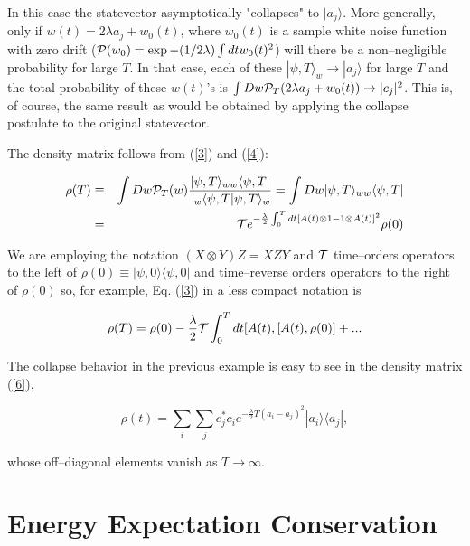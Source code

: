 \documentclass[12pt]{article}
\begin{document}
\noindent In this case the statevector asymptotically 
"collapses" to $|a_{j}\rangle$. More generally, only if 
$w(t)=2\lambda a_{j}+w_{0}(t)$, where $w_{0}(t)$ is a sample white noise function with 
zero drift (${\cal P}(w_{0})=\exp -(1/2\lambda)\int dtw_{0}(t)^{2}$) will there be a  
non--negligible probability for large $T$.  In that case, 
each of these $|\psi,T\rangle_{w}\rightarrow |a_{j}\rangle$ for large $T$ and the 
total probability of these $w(t)$'s is 
$\int Dw{\cal P}_{T}(2\lambda a_{j}+w_{0}(t))\rightarrow |c_{j}|^{2}$. 
This is, of course, the same result as would be obtained by applying 
the collapse postulate to the original statevector. 

	The density matrix follows from (\ref{3}) and (\ref{4}):  
	
\begin{eqnarray}\label{6}
	\rho (T)&\equiv&\int Dw{\cal P}_{T}(w)\frac{|\psi,T\rangle_{ww}
	\langle\psi,T|}{\ _{w}\langle\psi,T|\psi,T\rangle_{w}}
	=\int Dw|\psi,T\rangle_{ww}\langle\psi,T|\nonumber\\
	&=&{\cal T}e^
	{-\frac{\lambda}{2}\int_{0}^{T} dt[A(t)\otimes 1-1\otimes A(t)]^{2}}\rho (0)
\end{eqnarray} 

\noindent We are employing the notation $(X\otimes Y)Z=XZY$ 
and ${\cal T}$ time--orders operators to the left of $\rho (0)\equiv |\psi,0\rangle 
	\langle\psi,0|$ and 
time--reverse orders operators to the right of $\rho (0)$ so, for example,  Eq. (\ref{3}) in 
a less compact notation is 

\begin{eqnarray*}
	\rho (T) = \rho (0)-\frac{\lambda}{2}{\cal T}\int_{0}^{T} dt[A(t),[A(t), \rho (0)] + ...
\end{eqnarray*}

\noindent The collapse 
behavior in the previous example is easy to see in the 
density matrix (\ref{6}), 

\begin{displaymath}
\rho (t)=\sum_{i}\sum_{j}c_{j}^{*}c_{i}e^{-\frac{\lambda}{2} T(a_{i}-a_{j})^{2}}
|a_{i}\rangle\langle a_{j}|,
\end{displaymath}

\noindent whose off--diagonal elements vanish as $T\rightarrow\infty$. 

 \section{Energy Expectation Conservation}\label{Energy Conservation}
 
\end{document}

